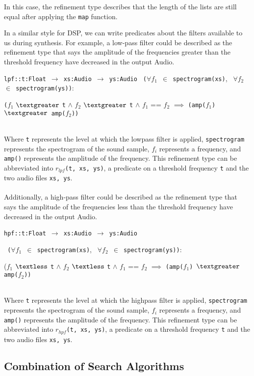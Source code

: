 \noindent In this case, the refinement type describes that the length of the lists are still equal after applying the \texttt{map} function.

In a similar style for DSP, we can write predicates about the filters available to us during synthesis. 
For example, a low-pass filter could be described as the refinement type that says the amplitude of the frequencies greater than the threshold frequency have decreased in the output Audio.

\texttt{lpf::t:Float} $\,\to\,$  \texttt{xs:Audio} $\,\to\,$ \texttt{ys:Audio} \textbar
\texttt{ ($\forall$$f_1$ $\in$ spectrogram(xs)}, \texttt{ $\forall$$f_2$ $\in$ spectrogram(ys))}:  \centerline{\texttt{(}$f_1$ $\textgreater$ \texttt{t}  $\land$  $f_2$ $\textgreater$ \texttt{t}  $\land$  $f_1$ == $f_2$ $\implies$ \texttt{(amp($f_1$) $\textgreater$ amp($f_2$))}} ~\\
Where \texttt{t} represents the level at which the lowpass filter is applied, \texttt{spectrogram} represents the spectrogram of the sound sample, $f_i$ represents a frequency, and \texttt{amp()} represents the amplitude of the frequency. This refinement type can be abbreviated into \texttt{$r_{lpf}$(t, xs, ys)}, a predicate on a threshold frequency \texttt{t} and the two audio files \texttt{xs, ys}. \\ \\
Additionally, a high-pass filter could be described as the refinement type that says the amplitude of the frequencies less than the threshold frequency have decreased in the output Audio. \\

\centerline{ \texttt{hpf::t:Float} $\,\to\,$  \texttt{xs:Audio} $\,\to\,$ \texttt{ys:Audio} \textbar }
\centerline{\texttt{ ($\forall$$f_1$ $\in$ spectrogram(xs)}, \texttt{ $\forall$$f_2$ $\in$ spectrogram(ys))}: } \centerline{($f_1$ $\textless$ \texttt{t}  $\land$  $f_2$ $\textless$ \texttt{t}  $\land$  $f_1$ == $f_2$ $\implies$ \texttt{(amp($f_1$) $\textgreater$ amp($f_2$))}} ~\\
Where \texttt{t} represents the level at which the highpass filter is applied, \texttt{spectrogram} represents the spectrogram of the sound sample, $f_i$ represents a frequency, and \texttt{amp()} represents the amplitude of the frequency. This refinement type can be abbreviated into \texttt{$r_{hpf}$(t, xs, ys)}, a predicate on a threshold frequency \texttt{t} and the two audio files \texttt{xs, ys}.

\subsection{Combination of Search Algorithms}

